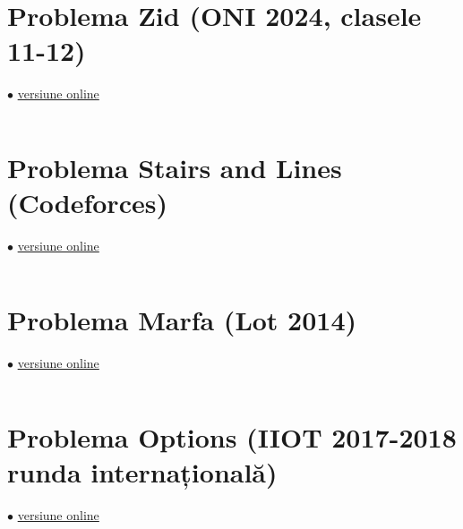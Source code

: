 \documentclass[../main.tex]{subfiles}
\begin{document}
\inputminted{cpp}{../src/math/riffles.cpp}

\section{Problema Zid (ONI 2024, clasele 11-12)}
\label{code:zid}
$\bullet$
\href{https://kilonova.ro/submissions/909820}{versiune online}

\inputminted{cpp}{../src/math/zid.cpp}

\section{Problema Stairs and Lines (Codeforces)}
\label{code:stairs-and-lines}
$\bullet$
\href{https://codeforces.com/contest/498/submission/248492580}{versiune online}

\inputminted{cpp}{../src/math/stairs-and-lines.cpp}

\section{Problema Marfa (Lot 2014)}
\label{code:marfa}
$\bullet$
\href{https://kilonova.ro/submissions/221597}{versiune online}

\inputminted{cpp}{../src/math/marfa.cpp}

\section{Problema Options (IIOT 2017-2018 runda internațională)}
\label{code:options}
$\bullet$
\href{https://kilonova.ro/submissions/1030972}{versiune online}

\inputminted{cpp}{../src/math/options.cpp}
\end{document}
